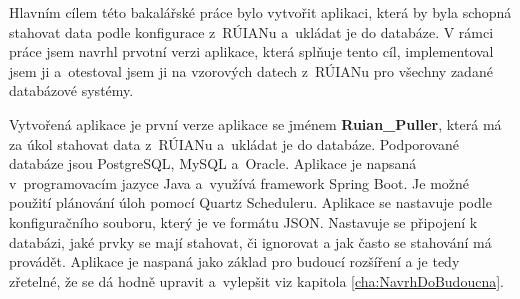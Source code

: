 Hlavním cílem této bakalářské práce bylo vytvořit aplikaci, která by byla 
schopná stahovat data podle konfigurace z~RÚIANu a~ukládat je do databáze.
V rámci práce jsem navrhl prvotní verzi aplikace, která splňuje tento cíl,
implementoval jsem ji a~otestoval jsem ji na vzorových datech z~RÚIANu
pro všechny zadané databázové systémy.

Vytvořená aplikace je první verze aplikace se jménem \textbf{Ruian\_Puller}, 
která má za úkol stahovat data z~RÚIANu a~ukládat je do databáze.
Podporované databáze jsou PostgreSQL, MySQL a~Oracle.
Aplikace je napsaná v~programovacím jazyce Java a~využívá framework Spring Boot.
Je možné použití plánování úloh pomocí Quartz Scheduleru.
Aplikace se nastavuje podle konfiguračního souboru,
který je ve formátu JSON. Nastavuje se připojení k databázi,
jaké prvky se mají stahovat, či ignorovat a jak často se stahování má provádět.
Aplikace je naspaná jako základ pro budoucí rozšíření a je tedy zřetelné,
že se dá hodně upravit a~vylepšit viz kapitola \ref{cha:NavrhDoBudoucna}.

